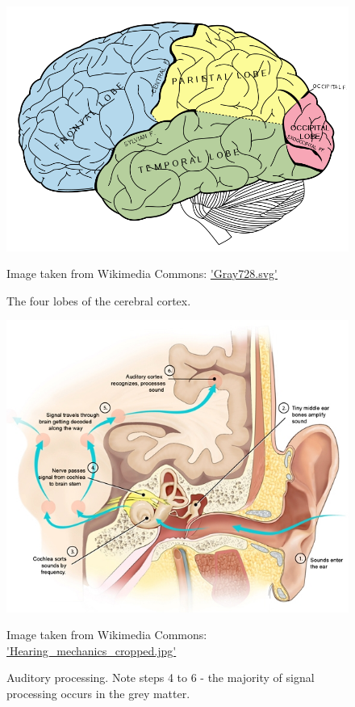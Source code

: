\documentclass[honours,12pt]{unswthesis}
\numberwithin{equation}{section}
\begin{document}
\begin{figure}[h]
	\centering
	\includegraphics[width=\textwidth]{Images/2_Lobes_of_the_brain_NL.png}
	\caption{The four lobes of the cerebral cortex.}
	\small Image taken from Wikimedia Commons: \url{'Gray728.svg'}
\end{figure}

\begin{figure}[h]
	\centering
	\includegraphics[width=\textwidth]{Images/2_Hearing_mechanics_cropped.jpg}
	\caption{Auditory processing. Note steps 4 to 6 - the majority of signal processing occurs in the grey matter.}
	\small Image taken from Wikimedia Commons: \url{'Hearing_mechanics_cropped.jpg'}
\end{figure}
\end{document}
